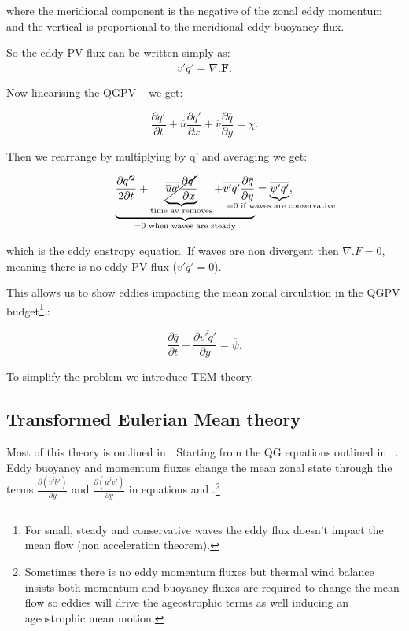 where the meridional component is the negative of the zonal eddy momentum and the vertical is proportional to the meridional eddy buoyancy flux.

So the eddy PV flux can be written simply as:
\begin{equation}
\overline{v'q'}=\nabla . \textbf{F} .
\end{equation}

Now linearising the QGPV ~ we get:

\begin{equation}
\frac{\partial q'}{\partial t} + \overline{u}\frac{\partial q'}{\partial x} + \overline{v}\frac{\partial \overline{q}}{\partial y}=\chi .
\end{equation}

Then we rearrange by multiplying by q' and averaging we get:

\begin{equation}
\underbrace{\frac{\partial q'^{2}}{2 \partial t} +  \underbrace{\cancel{\overline{\overline{u}q'}\frac{\partial q'}{\partial x}}}_\text{time av removes} + \overline{v'q'}\frac{\partial \overline{q}}{\partial y}}_\text{=0 when waves are steady}= \underbrace{\overline{\psi ' q'}}_{\mathclap{\text{ =0 if waves are conservative}}},
\end{equation}

which is the eddy enstropy equation. If waves are non divergent then $\nabla . F = 0$, meaning there is no eddy PV flux ($\overline{v'q'} = 0$).

This allows us to show eddies impacting the mean zonal circulation in the QGPV budget\footnote{For small, steady and conservative waves the eddy flux doesn't impact the mean flow (non acceleration theorem).}.:

\begin{equation}
\frac{\partial \overline{q}}{\partial t} + \frac{\partial \overline{v'q'}}{\partial y} = \overline{\psi} .
\end{equation}



To simplify the problem we introduce \gls{TEM} theory. 


\subsection{Transformed Eulerian Mean theory}
\label{sec:TEM}
Most of this theory is outlined in \citet{Marshall2003}. Starting from the QG equations outlined in ~. Eddy buoyancy and momentum fluxes change the mean zonal state through the terms $\frac{\partial (\overline{v'b'})}{\partial y}$ and $\frac{\partial (\overline{u'v'})}{\partial y}$ in equations  and .\footnote{Sometimes there is no eddy momentum fluxes but thermal wind balance insists both momentum and buoyancy fluxes are required to change the mean flow so eddies will drive the ageostrophic terms as well inducing an ageostrophic mean motion.} 

